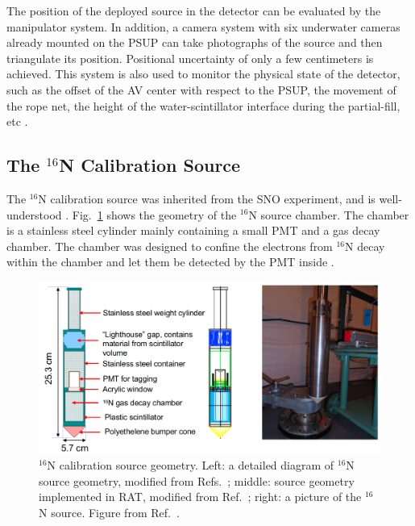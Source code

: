 The position of the deployed source in the detector can be evaluated by the manipulator system. In addition, a camera system with six underwater cameras already mounted on the PSUP can take photographs of the source and then triangulate its position. Positional uncertainty of only a few centimeters is achieved. This system is also used to monitor the physical state of the detector, such as the offset of the AV center with respect to the PSUP, the movement of the rope net, the height of the water-scintillator interface during the partial-fill, etc \cite{snop_jinst,singh2020underwater}.

\subsection{The $^{16}$N Calibration Source}\label{sect:n16}

The $^{16}$N calibration source was inherited from the SNO experiment, and is well-understood \cite{dragowsky1999sudbury,dragowsky200216n,hamer2001energy}. Fig.~\ref{n16pic} shows the geometry of the $^{16}$N source chamber. The chamber is a stainless steel cylinder mainly containing a small PMT and a gas decay chamber. The chamber was designed to confine the electrons from $^{16}$N decay within the chamber and let them be detected by the PMT inside \cite{dragowsky1999sudbury}.

\begin{figure}[!htb]
	\centering
	\includegraphics[width=12cm]{n16geom.png}
	\caption[$^{16}$N calibration source geometry.]{$^{16}$N calibration source geometry. Left: a detailed diagram of $^{16}$N source geometry, modified from Refs.~\cite{maclellan2009energy,matt_deployedsource}; middle: source geometry implemented in RAT, modified from Ref.~\cite{n16geom_zach}; right: a picture of the $^{16}$N source. Figure from Ref.~\cite{n16pic}.}
	\label{n16pic}
\end{figure}


